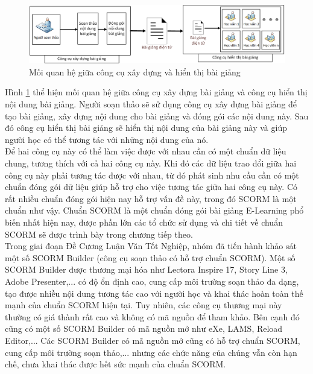 	\begin{center}
		\begin{figure}[htp]
			\begin{center}
				\includegraphics[width=16cm]{Chapter1/Pictures/picture11.png}
			\end{center}
			\caption{Mối quan hệ giữa công cụ xây dựng và hiển thị bài giảng}
			\label{picture11}
		\end{figure}
	\end{center}
	
	\newpage
	
	
	Hình \ref{picture11} thể hiện mối quan hệ giữa công cụ xây dựng bài giảng và công cụ hiển thị nội dung bài giảng. Người soạn thảo sẽ sử dụng công cụ xây dựng bài giảng để tạo bài giảng, xây dựng nội dung cho bài giảng và đóng gói các nội dung này. Sau đó công cụ hiển thị bài giảng sẽ hiển thị nội dung của bài giảng này và giúp người học có thể tương tác với những nội dung của nó.\\
	
	Để hai công cụ này có thể làm việc được với nhau cần có một chuẩn dữ liệu chung, tương thích với cả hai công cụ này. Khi đó các dữ liệu trao đổi giữa hai công cụ này phải tương tác được với nhau, từ đó phát sinh nhu cầu cần có một chuẩn đóng gói dữ liệu giúp hỗ trợ cho việc tương tác giữa hai công cụ này. Có rất nhiều chuẩn đóng gói hiện nay hỗ trợ vấn đề này, trong đó SCORM là một chuẩn như vậy. Chuẩn SCORM là một chuẩn đóng gói bài giảng E-Learning phổ biến nhất hiện nay, được phần lớn các tổ chức sử dụng và chi tiết về chuẩn SCORM sẽ được trình bày trong chương tiếp theo.\\
	
	
	Trong giai đoạn Đề Cương Luận Văn Tốt Nghiệp, nhóm đã tiến hành khảo sát một số SCORM Builder (công cụ soạn thảo có hỗ trợ chuẩn SCORM). Một số SCORM Builder được thương mại hóa như Lectora Inspire 17, Story Line 3, Adobe Presenter,... có độ ổn định cao, cung cấp môi trường soạn thảo đa dạng, tạo được nhiều nội dung tương tác cao với người học và khai thác hoàn toàn thế mạnh của chuẩn SCORM hiện tại. Tuy nhiên, các công cụ thương mại này thường có giá thành rất cao và không có mã nguồn để tham khảo. Bên cạnh đó cũng có một số SCORM Builder có mã nguồn mở như eXe, LAMS, Reload Editor,... Các SCORM Builder có mã nguồn mở cũng có hỗ trợ chuẩn SCORM, cung cấp môi trường soạn thảo,... nhưng các chức năng của chúng vẫn còn hạn chế, chưa khai thác được hết sức mạnh của chuẩn SCORM.\\
	

